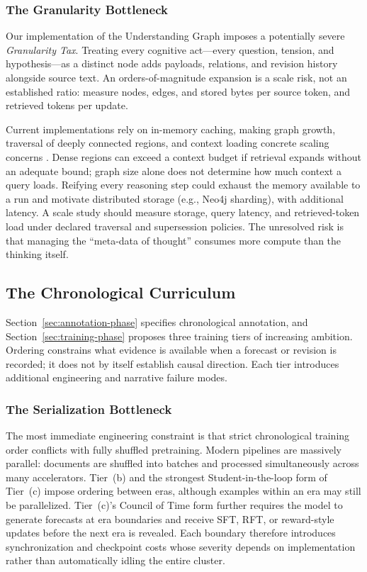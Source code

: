\subsubsection{The Granularity Bottleneck}

Our implementation of the Understanding Graph imposes a potentially severe \emph{Granularity Tax}. Treating every cognitive act---every question, tension, and hypothesis---as a distinct node adds payloads, relations, and revision history alongside source text. An orders-of-magnitude expansion is a scale risk, not an established ratio: measure nodes, edges, and stored bytes per source token, and retrieved tokens per update.

Current implementations rely on in-memory caching, making graph growth, traversal of deeply connected regions, and context loading concrete scaling concerns \cite{westerberg2026understanding}. Dense regions can exceed a context budget if retrieval expands without an adequate bound; graph size alone does not determine how much context a query loads. Reifying every reasoning step could exhaust the memory available to a run and motivate distributed storage (e.g., Neo4j sharding), with additional latency. A scale study should measure storage, query latency, and retrieved-token load under declared traversal and supersession policies. The unresolved risk is that managing the ``meta-data of thought'' consumes more compute than the thinking itself.

\subsection{The Chronological Curriculum}\label{sec:limitations-chronological}

Section~\ref{sec:annotation-phase} specifies chronological annotation, and
Section~\ref{sec:training-phase} proposes three training tiers of increasing
ambition. Ordering constrains what evidence is available when a forecast or
revision is recorded; it does not by itself establish causal direction. Each
tier introduces additional engineering and narrative failure modes.

\subsubsection{The Serialization Bottleneck}

The most immediate engineering constraint is that strict chronological training
order conflicts with fully shuffled pretraining. Modern pipelines are massively
parallel: documents are shuffled into batches and processed simultaneously
across many accelerators. Tier~(b) and the strongest Student-in-the-loop form of
Tier~(c) impose ordering between eras, although examples within an era may still
be parallelized. Tier~(c)'s Council of Time form \cite{westerberg2026thl}
further requires the model to generate forecasts at era boundaries and receive
SFT, RFT, or reward-style updates before the next era is revealed. Each boundary
therefore introduces synchronization and checkpoint costs whose severity
depends on implementation rather than automatically idling the entire cluster.

